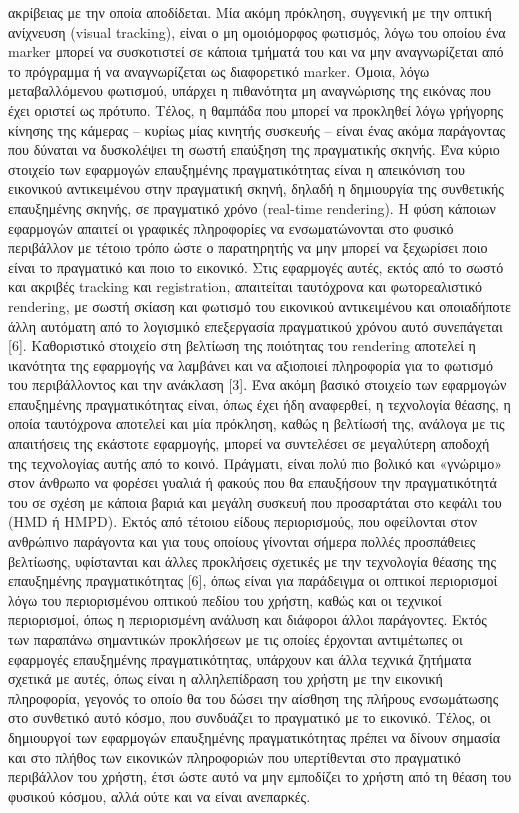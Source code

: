 ακρίβειας με την οποία αποδίδεται. Μία ακόμη πρόκληση, συγγενική με την οπτική ανίχνευση (visual tracking), είναι ο μη ομοιόμορφος φωτισμός, λόγω του οποίου ένα marker μπορεί να συσκοτιστεί σε κάποια τμήματά του και να μην αναγνωρίζεται από το πρόγραμμα ή να αναγνωρίζεται ως διαφορετικό marker. Όμοια, λόγω μεταβαλλόμενου φωτισμού, υπάρχει η πιθανότητα μη αναγνώρισης της εικόνας που έχει οριστεί ως πρότυπο. Τέλος, η θαμπάδα που μπορεί να προκληθεί λόγω γρήγορης κίνησης της κάμερας – κυρίως μίας κινητής συσκευής – είναι ένας ακόμα παράγοντας που δύναται να δυσκολέψει τη σωστή επαύξηση της πραγματικής σκηνής. Ένα κύριο στοιχείο των εφαρμογών επαυξημένης πραγματικότητας είναι η απεικόνιση του εικονικού αντικειμένου στην πραγματική σκηνή, δηλαδή η δημιουργία της συνθετικής επαυξημένης σκηνής, σε πραγματικό χρόνο (real-time rendering). Η φύση κάποιων εφαρμογών απαιτεί οι γραφικές πληροφορίες να ενσωματώνονται στο φυσικό περιβάλλον με τέτοιο τρόπο ώστε ο παρατηρητής να μην μπορεί να ξεχωρίσει ποιο είναι το πραγματικό και ποιο το εικονικό. Στις εφαρμογές αυτές, εκτός από το σωστό και ακριβές tracking και registration, απαιτείται ταυτόχρονα και φωτορεαλιστικό rendering, με σωστή σκίαση και φωτισμό του εικονικού αντικειμένου και οποιαδήποτε άλλη αυτόματη από το λογισμικό επεξεργασία πραγματικού χρόνου αυτό συνεπάγεται [6]. Καθοριστικό στοιχείο στη βελτίωση της ποιότητας του rendering αποτελεί η ικανότητα της εφαρμογής να λαμβάνει και να αξιοποιεί πληροφορία για το φωτισμό του περιβάλλοντος και την ανάκλαση [3]. Ένα ακόμη βασικό στοιχείο των εφαρμογών επαυξημένης πραγματικότητας είναι, όπως έχει ήδη αναφερθεί, η τεχνολογία θέασης, η οποία ταυτόχρονα αποτελεί και μία πρόκληση, καθώς η βελτίωσή της, ανάλογα με τις απαιτήσεις της εκάστοτε εφαρμογής, μπορεί να συντελέσει σε μεγαλύτερη αποδοχή της τεχνολογίας αυτής από το κοινό. Πράγματι, είναι πολύ πιο βολικό και «γνώριμο» στον άνθρωπο να φορέσει γυαλιά ή φακούς που θα επαυξήσουν την πραγματικότητά του σε σχέση με κάποια βαριά και μεγάλη συσκευή που προσαρτάται στο κεφάλι του (HMD ή HMPD). Εκτός από τέτοιου είδους περιορισμούς, που οφείλονται στον ανθρώπινο παράγοντα και για τους οποίους γίνονται σήμερα πολλές προσπάθειες βελτίωσης, υφίστανται και άλλες προκλήσεις σχετικές με την τεχνολογία θέασης της επαυξημένης πραγματικότητας [6], όπως είναι για παράδειγμα οι οπτικοί περιορισμοί λόγω του περιορισμένου οπτικού πεδίου του χρήστη, καθώς και οι τεχνικοί περιορισμοί, όπως η περιορισμένη ανάλυση και διάφοροι άλλοι παράγοντες. Εκτός των παραπάνω σημαντικών προκλήσεων με τις οποίες έρχονται αντιμέτωπες οι εφαρμογές επαυξημένης πραγματικότητας, υπάρχουν και άλλα τεχνικά ζητήματα σχετικά με αυτές, όπως είναι η αλληλεπίδραση του χρήστη με την εικονική πληροφορία, γεγονός το οποίο θα του δώσει την αίσθηση της πλήρους ενσωμάτωσης στο συνθετικό αυτό κόσμο, που συνδυάζει το πραγματικό με το εικονικό. Τέλος, οι δημιουργοί των εφαρμογών επαυξημένης πραγματικότητας πρέπει να δίνουν σημασία και στο πλήθος των εικονικών πληροφοριών που υπερτίθενται στο πραγματικό περιβάλλον του χρήστη, έτσι ώστε αυτό να μην εμποδίζει το χρήστη από τη θέαση του φυσικού κόσμου, αλλά ούτε και να είναι ανεπαρκές.
 
